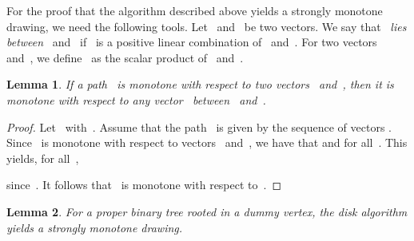 \documentclass[a4paper,11pt]{article}
\theoremstyle{plain}
\newtheorem{lemma}{Lemma}
\begin{document}
For the proof that the algorithm described above yields a strongly monotone 
drawing, we need the following tools. Let~ and~ be two 
vectors. We say that~ \emph{lies between}~ and~ 
if~ is a positive linear combination of~ and~.
For two vectors~ and~, we 
define~ as the 
scalar product of~ and~.

\begin{lemma}\label{lem:between}
  If a path~ is monotone with respect to two vectors~ 
  and~, then it is monotone with respect to any vector~
  between~ and~.
\end{lemma}

\begin{proof}
  Let~ 
  with~. Assume that the path~ is given by the 
  sequence of vectors .
  Since~ is monotone with respect to vectors~ and~, we 
  have that  and 
   for all~. This yields, for 
  all~,
  
  since~. It follows that~ is monotone with respect 
  to~.
\end{proof}

\begin{lemma}\label{lem:strict-mon-bintree-proof}
  For a proper binary tree rooted in a dummy vertex,
  the disk algorithm yields a strongly monotone drawing.
\end{lemma}
  
\end{document}
